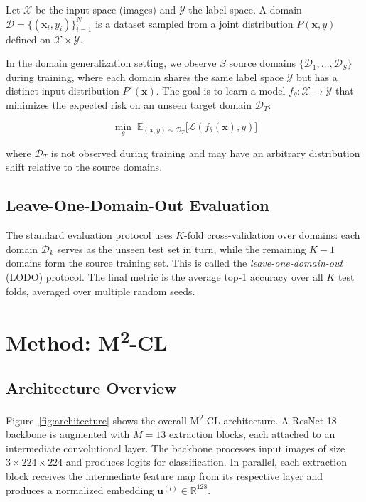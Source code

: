 \documentclass[12pt,a4paper]{article}
\begin{document}
Let $\mathcal{X}$ be the input space (images) and $\mathcal{Y}$ the label space.
A domain $\mathcal{D} = \{(\mathbf{x}_i, y_i)\}_{i=1}^{N}$ is a dataset sampled from
a joint distribution $P(\mathbf{x}, y)$ defined on $\mathcal{X} \times \mathcal{Y}$.

In the domain generalization setting, we observe $S$ source domains
$\{\mathcal{D}_1, \ldots, \mathcal{D}_S\}$ during training, where each domain shares
the same label space $\mathcal{Y}$ but has a distinct input distribution $P^s(\mathbf{x})$.
The goal is to learn a model $f_\theta: \mathcal{X} \to \mathcal{Y}$ that minimizes
the expected risk on an unseen target domain $\mathcal{D}_T$:

\begin{equation}
  \min_\theta \; \mathbb{E}_{(\mathbf{x},y) \sim \mathcal{D}_T}
  \bigl[\mathcal{L}(f_\theta(\mathbf{x}), y)\bigr]
\end{equation}

where $\mathcal{D}_T$ is not observed during training and may have an arbitrary
distribution shift relative to the source domains.

\subsection{Leave-One-Domain-Out Evaluation}

The standard evaluation protocol uses $K$-fold cross-validation over domains:
each domain $\mathcal{D}_k$ serves as the unseen test set in turn, while the
remaining $K{-}1$ domains form the source training set. This is called the
\emph{leave-one-domain-out} (LODO) protocol. The final metric is the average
top-1 accuracy over all $K$ test folds, averaged over multiple random seeds.

\section{Method: M\textsuperscript{2}-CL}
\label{sec:method}

\subsection{Architecture Overview}

Figure~\ref{fig:architecture} shows the overall M\textsuperscript{2}-CL architecture.
A ResNet-18 backbone is augmented with $M{=}13$ extraction blocks, each attached to an
intermediate convolutional layer. The backbone processes input images of size
$3{\times}224{\times}224$ and produces logits for classification. In parallel, each
extraction block receives the intermediate feature map from its respective layer and
produces a normalized embedding $\mathbf{u}^{(l)} \in \mathbb{R}^{128}$.
\end{document}
